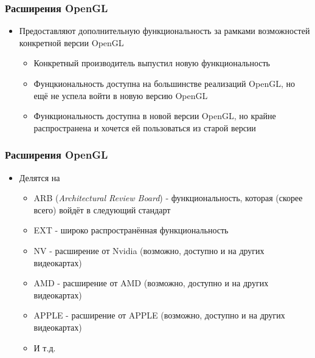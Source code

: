 \documentclass{beamer}
\begin{document}
\begin{frame}[fragile]
\frametitle{Расширения OpenGL}
\begin{itemize}
\item Предоставляют дополнительную функциональность за рамками возможностей конкретной версии OpenGL
\pause
\begin{itemize}
\item Конкретный производитель выпустил новую функциональность
\pause
\item Фунцкиональность доступна на большинстве реализаций OpenGL, но ещё не успела войти в новую версию OpenGL
\pause
\item Функциональность доступна в новой версии OpenGL, но крайне распространена и хочется ей пользоваться из старой версии
\end{itemize}
\end{itemize}
\end{frame}

\begin{frame}[fragile]
\frametitle{Расширения OpenGL}
\begin{itemize}
\item Делятся на
\begin{itemize}
\item ARB (\textit{Architectural Review Board}) - функциональность, которая (скорее всего) войдёт в следующий стандарт
\item EXT - широко распространённая функциональность
\item NV - расширение от Nvidia (возможно, доступно и на других видеокартах)
\item AMD - расширение от AMD (возможно, доступно и на других видеокартах)
\item APPLE - расширение от APPLE (возможно, доступно и на других видеокартах)
\item И т.д.
\end{itemize}
\end{itemize}
\end{frame}
\end{document}
